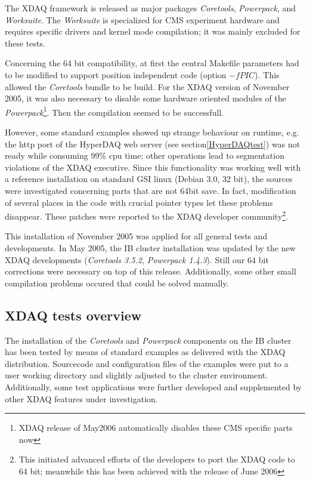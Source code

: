 The XDAQ framework is released as major 
packages {\em Coretools}, {\em Powerpack}, and {\em Worksuite}.
The {\em Worksuite} is specialized for CMS experiment hardware and
requires specific drivers and kernel mode compilation; it was mainly
excluded for these tests.

Concerning the 64 bit compatibility, at first 
the central Makefile parameters had to be modified to support
position independent code (option $-fPIC$). This allowed the
{\em Coretools} bundle to be build. For the XDAQ version of
November 2005, it was also necessary to disable some hardware oriented
modules of the {\em Powerpack}\footnote{XDAQ release of May2006 automatically 
disables these CMS specific parts now}.
Then the compilation seemed to be successfull.


However, some standard examples showed up strange behaviour on
runtime, e.g. the http port of the HyperDAQ web server
(see section\ref{HyperDAQtest}) was not ready while consuming 99\% cpu time; 
other operations lead to segmentation violations of the XDAQ executive.
Since this functionality was working well with a reference installation on standard GSI
linux (Debian 3.0, 32 bit), the sources were investigated concerning parts that
are not 64bit save.
In fact, modification of several places in the code with crucial pointer types 
let these problems disappear. These patches were reported to the XDAQ developer
community\footnote{This initiated advanced efforts of the developers to port the XDAQ code 
to 64 bit; meanwhile this has been achieved with the release of June 2006}.

This installation of November 2005 was applied for all general tests and
developments. In May 2005, the IB cluster installation was updated by the new
XDAQ developments ({\em Coretools 3.5.2}, {\em Powerpack 1.4.3}). 
Still our 64 bit corrections were necessary on top of this
release. Additionally, some other small compilation problems occured that
could be solved manually. 











\subsection{XDAQ tests overview}
\label{XDAQ-tests}

The installation of the {\em Coretools} and {\em Powerpack} components
on the IB cluster has been tested by means of standard examples as delivered
with the XDAQ distribution. Sourcecode and configuration files of the examples 
were put to a user working directory and slightly 
adjusted to the cluster environment. Additionally, some test applications 
were further developed and supplemented by other XDAQ features under
investigation.

